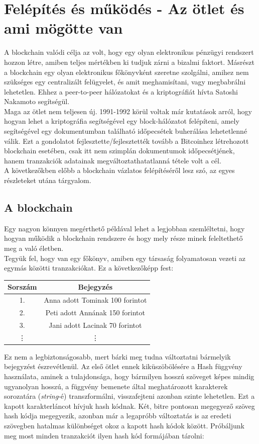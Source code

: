 \documentclass[11pt,a4paper]{article}
\begin{document}
\section{Felépítés és működés - Az ötlet és ami mögötte van}
A blockchain valódi célja az volt, hogy egy olyan elektronikus pénzügyi rendszert hozzon létre, amiben teljes mértékben ki tudjuk zárni a bizalmi faktort. Másrészt a blockchain egy olyan elektronikus főkönyvként szeretne szolgálni, amihez nem szükséges egy centralizált felügyelet, és amit meghamisítani, vagy megbabrálni lehetetlen. Ehhez a peer-to-peer hálózatokat és a kriptográfiát hívta Satoshi Nakamoto segítségül.\\
Maga az ötlet nem teljesen új. 1991-1992 körül voltak már kutatások arról, hogy hogyan lehet a kriptográfia segítségével egy block-hálózatot felépíteni, amely segítségével egy dokumentumban található időpecsétek buherálása lehetetlenné válik. Ezt a gondolatot fejlesztette/fejlesztették tovább a Bitcoinhez létrehozott blockchain esetében, csak itt nem szimplán dokumentumok időpecsétjének, hanem tranzakciók adatainak megváltoztathatatlanná tétele volt a cél. \\
A következőkben előbb a blockchain vázlatos felépítéséről lesz szó, az egyes részleteket utána tárgyalom.

\subsection{A blockchain}
Egy nagyon könnyen megérthető példával lehet a legjobban szemléltetni, hogy hogyan működik a blockchain rendszere és hogy mely része minek feleltethető meg a való életben. \\
Tegyük fel, hogy van egy főkönyv, amiben egy társaság folyamatosan vezeti az egymás közötti tranzakciókat. Ez a következőképp fest:

\begin{center}
\begin{tabular}{c|c}
Sorszám & Bejegyzés \\
\hline \hline
1. & Anna adott Tominak 100 forintot \\
\hline
2. & Peti adott Annának 150 forintot \\
\hline
3. & Jani adott Lacinak 70 forintot \\ 
\hline
\vdots & \vdots
\end{tabular}
\end{center}

\noindent Ez nem a legbiztonságosabb, mert bárki meg tudna változtatni bármelyik bejegyzést észrevétlenül. Az első ötlet ennek kiküszöbölésére a Hash függvény használata, aminek a tulajdonsága, hogy bármilyen hosszú szöveget képes mindig ugyanolyan hosszú, a függvény bemenete által meghatározott karakterek sorozatára (\textit{string}-é) transzformálni, visszafejteni azonban szinte lehetetlen. Ezt a kapott karakterláncot hívjuk hash kódnak. Két, bitre pontosan megegyező szöveg hash kódja megegyezik, azonban már a legapróbb változtatás is az eredeti szövegben hatalmas különbséget okoz a kapott hash kódok között. Próbáljunk meg most minden tranzakciót ilyen hash kód formájában tárolni:
\end{document}
